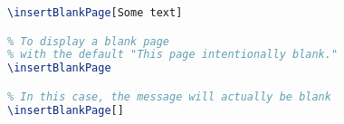 \begin{lstlisting}[language=tex]
% To display a blank page with a custom message
\insertBlankPage[Some text]

% To display a blank page 
% with the default "This page intentionally blank."
\insertBlankPage

% In this case, the message will actually be blank
\insertBlankPage[]
\end{lstlisting}
